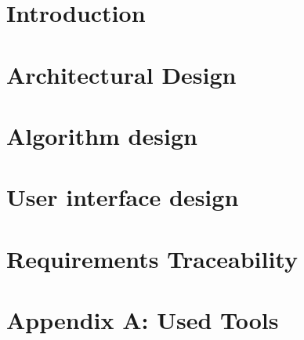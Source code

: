 \documentclass[openright]{report}
\newcommand\blankpage{%
    \null
    \thispagestyle{empty}%
    \addtocounter{page}{-1}%
    \newpage}
\begin{document}
	\begin{titlepage}
		
	\end{titlepage}


    \tableofcontents

    \newpage
    \blankpage
    \begin{abstract}
		
	\end{abstract}


    \chapter{Introduction}
    	

	\chapter{Architectural Design}
		

    \chapter{Algorithm design}
    	

    \chapter{User interface design}
    	

    \chapter{Requirements Traceability}
    	



    \clearpage
	\setcounter{page}{1}

	\blankpage

    \appendix
    \newpage
    \chapter{Appendix A: Used Tools}
	    
\end{document}
